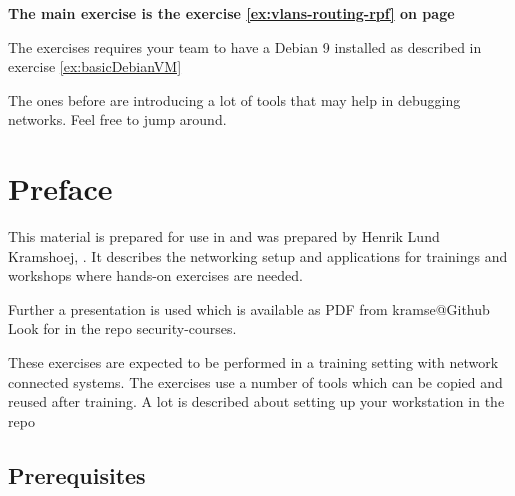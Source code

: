 \documentclass[a4paper,11pt,notitlepage]{report}
\begin{document}
\rm
{}

\newcommand{\emne}[1]{Core Infrastructure and BGP Intro workshop}
\newcommand{\kursus}[1]{Core Infrastructure and BGP Intro workshop}
\newcommand{\kursusnavn}[1]{Core Infrastructure and BGP Intro workshop\\ exercises}



{\bf\LARGE The main exercise is the exercise \ref{ex:vlans-routing-rpf} on page \pageref{ex:vlans-routing-rpf}}

The exercises requires your team to have a Debian 9 installed as described in exercise \ref{ex:basicDebianVM}

The ones before are introducing a lot of tools that may help in debugging networks. Feel free to jump around. \smiley



\setcounter{tocdepth}{0}

\normal

{\color{titlecolor}\tableofcontents}

\normal
\pagestyle{fancyplain}
\chapter*{\color{titlecolor}Preface}

This material is prepared for use in \emph{\kursus} and was prepared by
Henrik Lund Kramshoej,  .
It describes the networking setup and
applications for trainings and workshops where hands-on exercises are needed.

\vskip 1cm
Further a presentation is used which is available as PDF from kramse@Github\\
Look for \jobname in the repo security-courses.

These exercises are expected to be performed in a training setting with network connected systems. The exercises use a number of tools which can be copied and reused after training. A lot is described about setting up your workstation in the repo




\section*{\color{titlecolor}Prerequisites}
\end{document}
